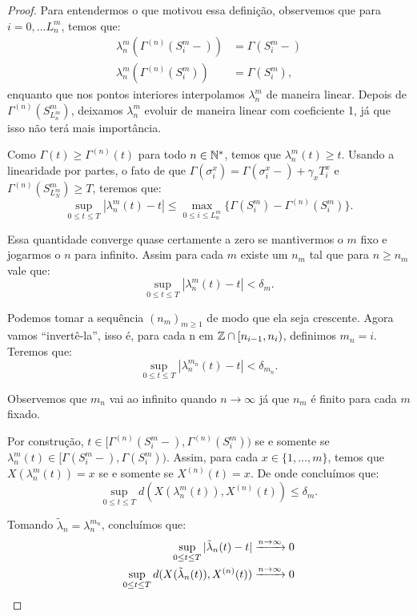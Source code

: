 \begin{proof}
  Para entendermos o que motivou essa definição, observemos que para $i =
  0, \ldots L_n^m$, temos que:
  \begin{align*}
    \lambda_n^m(\Gamma^{(n)}(S_i^m-)) &= \Gamma(S_i^m-)\\
    \lambda_n^m(\Gamma^{(n)}(S_i^m)) &= \Gamma(S_i^m),
  \end{align*}
  enquanto que nos pontos interiores interpolamos $\lambda_n^m$ de
  maneira linear. Depois de $\Gamma^{(n)}(S^m_{L_n^m})$, deixamos
  $\lambda_n^m$ evoluir de maneira linear com coeficiente 1, já que
  isso não terá mais importância.

  Como $\Gamma(t) \geq \Gamma^{(n)}(t)$ para todo $n \in {\mathbb{N^*}}$, temos
  que $\lambda_n^m(t) \geq t$. Usando a linearidade por partes, o fato
  de que $\Gamma(\sigma^x_i) = \Gamma(\sigma_i^x-) + \gamma_x T^x_i$ e
  $\Gamma^{(n)}(S^m_{L_N^m}) \geq T$, teremos que:
  \begin{displaymath}
    \sup_{0 \leq t \leq T} |\lambda_n^m(t) - t| \leq
    \max_{0 \leq i \leq L_n^m} \{ \Gamma(S_i^m) -
    \Gamma^{(n)}(S_i^m)\}.
  \end{displaymath}

  Essa quantidade converge quase certamente a zero se mantivermos o
  $m$ fixo e jogarmos o $n$ para infinito. Assim para cada $m$ existe
  um $n_m$ tal que para $n \geq n_m$ vale que:
  \begin{displaymath}
    \sup_{0 \leq t \leq T} |\lambda_n^m(t) - t| < \delta_m.
  \end{displaymath}

  Podemos tomar a sequência $(n_m)_{m \geq 1}$ de modo que ela seja
  crescente. Agora vamos ``invertê-la'', isso é, para cada n em ${\mathbb{Z}}
  \cap [n_{i-1}, n_i)$, definimos $m_n = i$. Teremos que:
  \begin{displaymath}
    \sup_{0 \leq t \leq T} |\lambda_n^{m_n}(t) - t| < \delta_{m_n}.
  \end{displaymath}

  Observemos que $m_n$ vai ao infinito quando $n \to \infty$ já que
  $n_m$ é finito para cada $m$ fixado.
  
  Por construção, $t \in [\Gamma^{(n)}(S_{i}^m-),
  \Gamma^{(n)}(S_{i}^m))$ se e somente se $\lambda_n^m(t) \in
  [\Gamma(S_{i}^m-), \Gamma(S_{i}^m))$. Assim, para cada $x \in \{1,
  \ldots, m\}$, temos que $X(\lambda_n^m(t)) = x$ se e somente se
  $X^{(n)}(t) = x$. De onde concluímos que:
  \begin{displaymath}
    \sup_{0 \leq t \leq T} d\left(X(\lambda_n^m(t)), X^{(n)} (t)\right)
    \leq \delta_m.
  \end{displaymath}

  Tomando $\tilde{\lambda}_n = \lambda_n^{m_n}$, concluímos que:
  \begin{align*}
    \sup_{0 \leq t \leq T} |\tilde{\lambda}_n(t) - t|
    &\xrightarrow{n\to\infty} 0 \\
    \sup_{0 \leq t \leq T} d(X(\tilde{\lambda}_n(t)), X^{(n)}(t))
    &\xrightarrow{n\to\infty} 0
    \qedhere
  \end{align*}
\end{proof}

